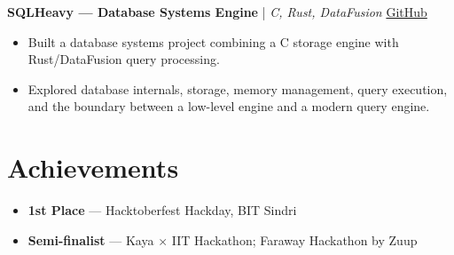 \documentclass[a4paper,9pt]{article}
\begin{document}
\vspace{1pt}

\textbf{SQLHeavy --- Database Systems Engine} | \textit{C, Rust, DataFusion}
\quad \href{https://github.com/rizzabhdwaj/SQLHeavy}{GitHub}

\begin{itemize}
    \item Built a database systems project combining a C storage engine with Rust/DataFusion query processing.
    \item Explored database internals, storage, memory management, query execution, and the boundary between a low-level engine and a modern query engine.
\end{itemize}

\section*{Achievements}

\begin{itemize}
    \item \textbf{1st Place} --- Hacktoberfest Hackday, BIT Sindri
    \item \textbf{Semi-finalist} --- Kaya $\times$ IIT Hackathon; Faraway Hackathon by Zuup
\end{itemize}
\end{document}
